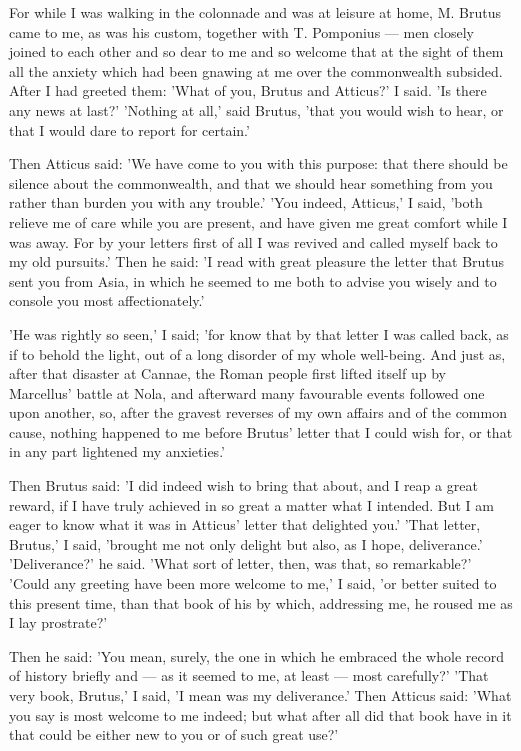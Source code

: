  For while I was walking in the colonnade and was at leisure at home, M. Brutus came to me, as was his custom, together with T. Pomponius — men closely joined to each other and so dear to me and so welcome that at the sight of them all the anxiety which had been gnawing at me over the commonwealth subsided. After I had greeted them: 'What of you, Brutus and Atticus?' I said. 'Is there any news at last?' 'Nothing at all,' said Brutus, 'that you would wish to hear, or that I would dare to report for certain.'

 Then Atticus said: 'We have come to you with this purpose: that there should be silence about the commonwealth, and that we should hear something from you rather than burden you with any trouble.' 'You indeed, Atticus,' I said, 'both relieve me of care while you are present, and have given me great comfort while I was away. For by your letters first of all I was revived and called myself back to my old pursuits.' Then he said: 'I read with great pleasure the letter that Brutus sent you from Asia, in which he seemed to me both to advise you wisely and to console you most affectionately.'

 'He was rightly so seen,' I said; 'for know that by that letter I was called back, as if to behold the light, out of a long disorder of my whole well-being. And just as, after that disaster at Cannae, the Roman people first lifted itself up by Marcellus' battle at Nola, and afterward many favourable events followed one upon another, so, after the gravest reverses of my own affairs and of the common cause, nothing happened to me before Brutus' letter that I could wish for, or that in any part lightened my anxieties.'

 Then Brutus said: 'I did indeed wish to bring that about, and I reap a great reward, if I have truly achieved in so great a matter what I intended. But I am eager to know what it was in Atticus' letter that delighted you.' 'That letter, Brutus,' I said, 'brought me not only delight but also, as I hope, deliverance.' 'Deliverance?' he said. 'What sort of letter, then, was that, so remarkable?' 'Could any greeting have been more welcome to me,' I said, 'or better suited to this present time, than that book of his by which, addressing me, he roused me as I lay prostrate?'

 Then he said: 'You mean, surely, the one in which he embraced the whole record of history briefly and — as it seemed to me, at least — most carefully?' 'That very book, Brutus,' I said, 'I mean was my deliverance.' Then Atticus said: 'What you say is most welcome to me indeed; but what after all did that book have in it that could be either new to you or of such great use?'

